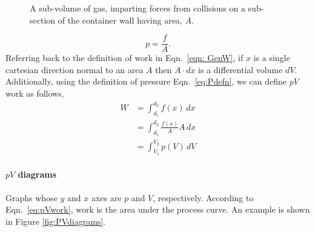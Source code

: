 \begin{figure}[h]
\begin{center}
\end{center}
\caption{A sub-volume of gas, imparting forces from collisions on a sub-section of the container wall having area, $A$.}\label{fig:pressure}
\end{figure}
\begin{equation}\label{eq:Pdefn}
p=\frac{f}{A}.
\end{equation}
Referring back to the definition of work in Eqn.~\ref{eqn: GenW}, if $x$ is a single cartesian direction normal to an area $A$ then $A\cdot dx$ is a differential volume $dV$.  Additionally, using the definition of pressure Eqn.~\ref{eq:Pdefn}, we can define $pV$ work as follows,
\begin{align}
\label{eq:pVwork}
W&=\int_{d_1}^{d_2}f(x)\,dx \nonumber \\
&=\int_{d_1}^{d_2}\frac{f(x)}{A}A\,dx \nonumber \\
&=\int_{V_1}^{V_2}p(V)\,dV 
\end{align}


\paragraph{$pV$ diagrams} Graphs whose $y$ and $x$ axes are $p$ and $V$, respectively.  According to Eqn.~\eqref{eq:pVwork}, work is the area under the process curve.  An example is shown in Figure \ref{fig:PVdiagrams}.

